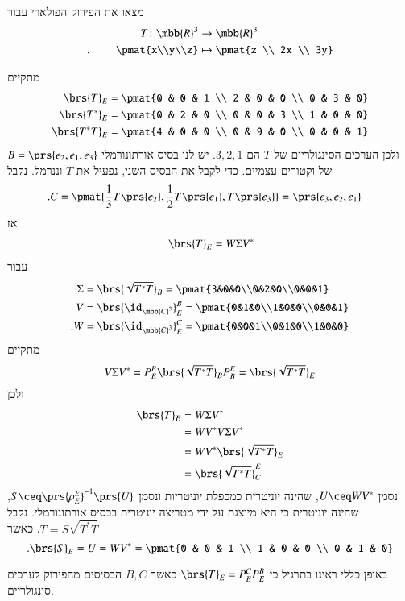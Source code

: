 \documentclass[a4paper,10pt,oneside,openany]{article}
\begin{document}
\begin{exercise}
מצאו את הפירוק הפולארי עבור
\begin{align*}
T \colon \mbb{R}^3 &\to \mbb{R}^3 \\
\text{.} \hphantom{lalala} \pmat{x\\y\\z} &\mapsto \pmat{z \\ 2x \\ 3y}
\end{align*}
\end{exercise}

\begin{solution}
מתקיים
\begin{align*}
\brs{T}_E &= \pmat{0 & 0 & 1 \\ 2 & 0 & 0 \\ 0 & 3 & 0} \\
\brs{T^*}_E &= \pmat{0 & 2 & 0 \\ 0 & 0 & 3 \\ 1 & 0 & 0} \\
\brs{T^* T}_E &= \pmat{4 & 0 & 0 \\ 0 & 9 & 0 \\ 0 & 0 & 1}
\end{align*}
ולכן הערכים הסינגולריים של
$T$
הם
$3,2,1$.
יש לנו בסיס אורתונורמלי
$B = \prs{e_2, e_1, e_3}$
של וקטורים עצמיים.
כדי לקבל את הבסיס השני, נפעיל את
$T$
וננרמל.
נקבל
\begin{align*}
\text{.} C &= \pmat{\frac{1}{3} T\prs{e_2}, \frac{1}{2} T\prs{e_1}, T\prs{e_3}}
= \prs{e_3, e_2, e_1}
\end{align*}
אז
\begin{align*}
\text{.} \brs{T}_E = W \Sigma V^*
\end{align*}
עבור
\begin{align*}
\Sigma &= \brs{\sqrt{T^* T}}_B = \pmat{3&0&0\\0&2&0\\0&0&1} \\
V &= \brs{\id_{\mbb{C}^3}}^B_E = \pmat{0&1&0\\1&0&0\\0&0&1}\\
\text{.} W &= \brs{\id_{\mbb{C}^3}}^C_E = \pmat{0&0&1\\0&1&0\\1&0&0}
\end{align*}
מתקיים
\[V \Sigma V^* = P^B_E \brs{\sqrt{T^* T}}_B P^E_B = \brs{\sqrt{T^* T}}_E\]
ולכן
\begin{align*}
\brs{T}_E &= W \Sigma V^*
\\&=
W V^* V \Sigma V^*
\\&=
W V^* \brs{\sqrt{T^* T}}_E
\\&=
\brs{\sqrt{T^* T}}^E_C
\end{align*}
נסמן
$U \ceq W V^*$,
שהינה יוניטרית כמכפלת יוניטריות ונסמן
$S \ceq \prs{\rho^E_E}^{-1}\prs{U}$,
שהינה יוניטרית כי היא מיוצגת על ידי מטריצה יוניטרית בבסיס אורתונורמלי.
נקבל
$T = S \sqrt{T^* T}$.
כאשר
\[\text{.} \brs{S}_E = U = WV^* = \pmat{0 & 0 & 1 \\ 1 & 0 & 0 \\ 0 & 1 & 0}\]
\end{solution}

\begin{remark}
באופן כללי ראינו בתרגיל כי
$\brs{T}_E =  P^C_E P^B_E$
כאשר
$B,C$
הבסיסים מהפירוק לערכים סינגולריים.
\end{remark}
\end{document}
